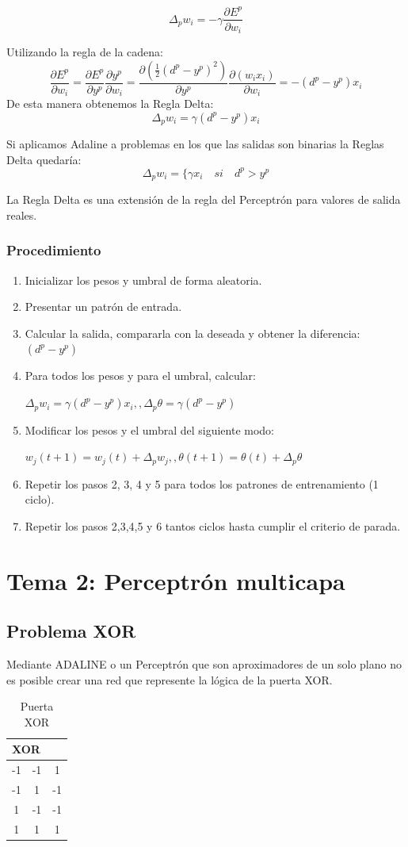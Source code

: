 \documentclass[12pt, twoside, openright]{report} %
\begin{document}
$$\Delta_pw_i=-\gamma\frac{\partial E^p}{\partial w_i}$$

Utilizando la regla de la cadena:
$$\frac{\partial E^p}{\partial w_i}=\frac{\partial E^p}{\partial y^p}\frac{\partial y^p}{\partial w_i}=\frac{\partial (\frac 1 2 (d^p-y^p)^2)}{\partial y^p}\frac{\partial(w_ix_i)}{\partial w_i}=-(d^p-y^p)x_i$$
De esta manera obtenemos la Regla Delta:
$$\Delta_pw_i=\gamma(d^p-y^p)x_i$$

Si aplicamos Adaline a problemas en los que las salidas son binarias la Reglas Delta quedaría:
$$\Delta_pw_i=\{ \gamma x_i \quad si \quad d^p > y^p$$

La Regla Delta es una extensión de la regla del Perceptrón para valores de salida reales.

\subsection{Procedimiento}
\begin{enumerate}
	\item Inicializar los pesos y umbral de forma aleatoria.
	\item Presentar un patrón de entrada.
	\item Calcular la salida, compararla con la deseada y obtener la diferencia: $(d^p-y^p)$
	\item Para todos los pesos y para el umbral, calcular:
	      
	      $\Delta_pw_i=\gamma(d^p-y^p)x_i,, \Delta_p\theta=\gamma(d^p-y^p)$
	\item Modificar los pesos y el umbral del siguiente modo:
	      
	      $w_j(t+1)=w_j(t)+\Delta_pw_j,, \theta(t+1)=\theta(t)+\Delta_p\theta$
	\item Repetir los pasos 2, 3, 4 y 5 para todos los patrones de entrenamiento (1 ciclo).
	\item Repetir los pasos 2,3,4,5 y 6 tantos ciclos hasta cumplir el criterio de parada.
\end{enumerate}

\chapter{Tema 2: Perceptrón multicapa}
\section{Problema XOR}
Mediante ADALINE o un Perceptrón que son aproximadores de un solo plano no es posible crear una red que represente la lógica de la puerta XOR.
\begin{table}[H]
	\centering
	\caption{Puerta XOR}
	\begin{tabular}{cc|c}
		\multicolumn{2}{l}{XOR} & \multicolumn{1}{l}{} \\ \hline
		-1 & -1 & 1  \\
		-1 & 1  & -1 \\
		1  & -1 & -1 \\
		1  & 1  & 1
	\end{tabular}
\end{table}
\end{document}
